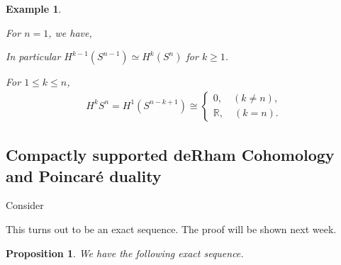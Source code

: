 \documentclass[8pt]{article}
\newtheorem{proposition}{Proposition}[section]
\newtheorem{example}{Example}[section]
\newcommand{\R}[0]{\mathbb{R}}
\newcommand{\M}[0]{\mathcal{M}}
\begin{document}
\begin{example}
\begin{center}
\begin{tikzcd}
\end{tikzcd}
  \end{center}
  For $n=1$, we have,
  \begin{center}
  \end{center}
  In particular $H^{k-1}(S^{n-1})\simeq H^k(S^n)$ for $k\geq1$.
  \par For $1\leq k\leq n$, 
  \begin{align*}
    H^kS^n = H^1(S^{n-k+1})\cong\begin{cases}
      0,\quad (k\not=n),\\
      \R,\quad (k=n).
    \end{cases}
  \end{align*}
\end{example}

\subsection{Compactly supported deRham Cohomology and Poincaré duality}

Consider 
\begin{center}
\end{center}

This turns out to be an exact sequence. The proof will be shown next week.

\begin{proposition}
  We have the following exact sequence.
  \begin{center}
  \end{center}
\end{proposition}
\end{document}
